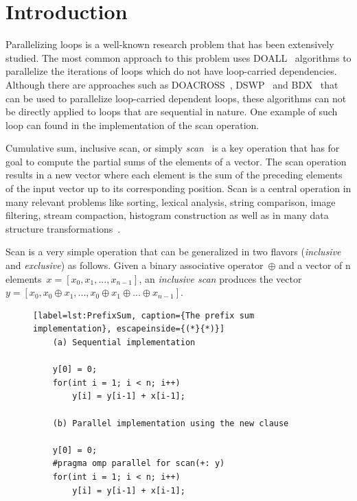 \documentclass[Ingles]{ic-tese-v1}
\begin{document}
\fimdaspaginasiniciais


\chapter{Introduction}
\label{cap:Introduction}

Parallelizing loops  is a  well-known research  problem that  has been
extensively  studied. The  most common  approach to  this problem  uses
DOALL~\cite{Lamport:1974} algorithms  to parallelize
the iterations of  loops which do not  have loop-carried dependencies.
Although  there  are   approaches  such  as  DOACROSS~\cite{doacross},
DSWP~\cite{Rangan:2004} and  BDX~\cite{Cesar:2015} that
can be  used to parallelize loop-carried dependent  loops, these algorithms
can  not  be  directly  applied   to  loops  that  are  sequential  in
nature. One  example of such loop  can found in the  implementation of
the scan operation.

Cumulative     sum,     inclusive     scan,     or     simply     {\it
	scan}~\cite{ScanAsPrimitive} is  a key operation that  has for goal
to compute  the partial  sums of  the elements of  a vector.  The scan
operation results in a new vector where each element is the sum of the
preceding  elements  of  the  input vector  up  to  its  corresponding
position. Scan is a central operation in many  relevant  problems  like  sorting,
lexical  analysis,  string comparison,  image  filtering, stream compaction,
histogram construction as well as  in many data
structure transformations~\cite{BlellochTR90}.

Scan  is a very simple  operation  that can  be generalized
in two flavors (\textit{inclusive} and \textit{exclusive}) as follows.
Given  a binary  associative  operator\  $\oplus$ and  a
vector of  n elements\ $x = [x_{0},  x_{1}, ...  ,x_{n-1}]$,
an   {\em    inclusive   scan}    produces   the    vector
$y =  [ x_{0}, x_{0}  \oplus x_{1},  ... ,x_{0} \oplus  x_{1} \oplus
... \oplus x_{n-1}]$.

\begin{figure}[t]
	\lstset{basicstyle=\scriptsize}
	\begin{lstlisting}[label=lst:PrefixSum, caption={The prefix sum implementation}, escapeinside={(*}{*)}]
	(a) Sequential implementation

	y[0] = 0;
	for(int i = 1; i < n; i++)
		y[i] = y[i-1] + x[i-1];

	(b) Parallel implementation using the new clause

	y[0] = 0;
	#pragma omp parallel for scan(+: y)
	for(int i = 1; i < n; i++)
		y[i] = y[i-1] + x[i-1];
	\end{lstlisting}
	\vspace{-0.7cm}
\end{figure}
\end{document}
